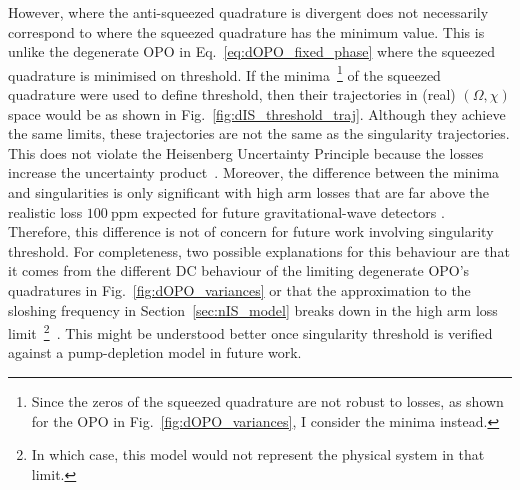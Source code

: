 However, where the anti-squeezed quadrature is divergent does not necessarily correspond to where the squeezed quadrature has the minimum value. This is unlike the degenerate OPO in Eq.~\ref{eq:dOPO_fixed_phase} where the squeezed quadrature is minimised on threshold.
If the minima~\footnote{Since the zeros of the squeezed quadrature are not robust to losses, as shown for the OPO in Fig.~\ref{fig:dOPO_variances}, I consider the minima instead.} of the squeezed quadrature were used to define threshold, then their trajectories in (real) $(\Omega,\chi)$ space would be as shown in Fig.~\ref{fig:dIS_threshold_traj}. Although they achieve the same limits, these trajectories are not the same as the singularity trajectories.
This does not violate the Heisenberg Uncertainty Principle because the losses increase the uncertainty product~\cite{}. %
Moreover, the difference between the minima and singularities is only significant  with high arm losses that are far above the realistic loss $100~\text{ppm}$ expected for future gravitational-wave detectors .
Therefore, this difference is not of concern for future work involving singularity threshold.
For completeness, two possible explanations for this behaviour are that it comes from the different DC behaviour of the limiting degenerate OPO's quadratures in Fig.~\ref{fig:dOPO_variances} or that the approximation to the sloshing frequency in Section~\ref{sec:nIS_model} breaks down in the high arm loss limit~\footnote{In which case, this model would not represent the physical system in that limit.}~\cite{}. This might be understood better once singularity threshold is verified against a pump-depletion model in future work.

